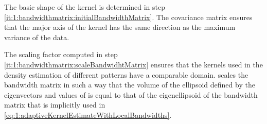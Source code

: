 		The basic shape of the kernel is determined in step \ref{it:1:bandwidthmatrix:initialBandwidthMatrix}. The covariance matrix ensures that the major axis of the kernel has the same direction as the maximum variance of the data.

		The scaling factor computed in step \ref{it:1:bandwidthmatrix:scaleBandwidhtMatrix} ensures that the kernels used in the density estimation of different patterns have a comparable domain.  scales the bandwidth matrix in such a way that the volume of the ellipsoid defined by the eigenvectors and values of \varBandwidthMatrix[\itXis] is equal to that of the eigenellipsoid of the bandwidth matrix that is implicitly used in \cref{eq:1:adaptiveKernelEstimateWithLocalBandwidths}.